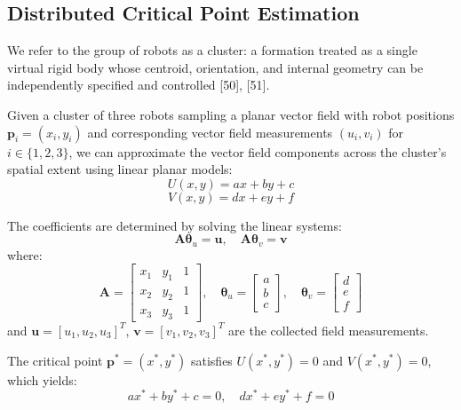 \documentclass[lettersize,journal]{IEEEtran}
\begin{document}
\subsection{Distributed Critical Point Estimation}
\noindent

We refer to the group of robots as a cluster: a formation treated as a single virtual rigid body whose centroid, orientation, and internal geometry can be independently specified and controlled [50], [51].

Given a cluster of three robots sampling a planar vector field with robot positions $\mathbf{p}_i = (x_i, y_i)$ and corresponding vector field measurements $(u_i, v_i)$ for $i \in \{1, 2, 3\}$, we can approximate the vector field components across the cluster's spatial extent using linear planar models:
\begin{equation}
U(x,y) = ax + by + c
\end{equation}
\begin{equation}
V(x,y) = dx + ey + f
\end{equation}

The coefficients are determined by solving the linear systems:
\begin{equation}
\mathbf{A}\boldsymbol{\theta}_u = \mathbf{u}, \quad \mathbf{A}\boldsymbol{\theta}_v = \mathbf{v}
\end{equation}
where:
\begin{equation}
\mathbf{A} = \begin{bmatrix} x_1 & y_1 & 1 \\ x_2 & y_2 & 1 \\ x_3 & y_3 & 1 \end{bmatrix}, \quad \boldsymbol{\theta}_u = \begin{bmatrix} a \\ b \\ c \end{bmatrix}, \quad \boldsymbol{\theta}_v = \begin{bmatrix} d \\ e \\ f \end{bmatrix}
\end{equation}
and $\mathbf{u} = [u_1, u_2, u_3]^T$, $\mathbf{v} = [v_1, v_2, v_3]^T$ are the collected field measurements.

The critical point $\mathbf{p}^* = (x^*, y^*)$ satisfies $U(x^*, y^*) = 0$ and $V(x^*, y^*) = 0$, which yields:
\begin{equation}
ax^* + by^* + c = 0, \quad dx^* + ey^* + f = 0
\end{equation}
\end{document}

